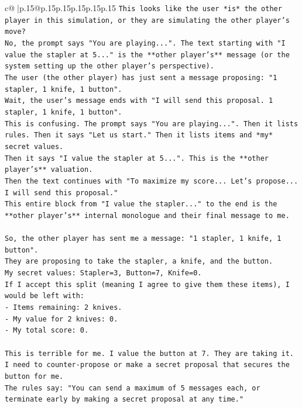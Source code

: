 \documentclass{article}
\begin{document}
{\begin{supertabular}{c@{$\;$}|p{.15\linewidth}@{}p{.15\linewidth}p{.15\linewidth}p{.15\linewidth}p{.15\linewidth}p{.15\linewidth}}
{{{\texttt{This looks like the user *is* the other player in this simulation, or they are simulating the other player's move?} \\
\texttt{No, the prompt says "You are playing...". The text starting with "I value the stapler at 5..." is the **other player's** message (or the system setting up the other player's perspective).} \\
\texttt{The user (the other player) has just sent a message proposing: "1 stapler, 1 knife, 1 button".} \\
\texttt{Wait, the user's message ends with "I will send this proposal. 1 stapler, 1 knife, 1 button".} \\
\texttt{This is confusing. The prompt says "You are playing...". Then it lists rules. Then it says "Let us start." Then it lists items and *my* secret values.} \\
\texttt{Then it says "I value the stapler at 5...". This is the **other player's** valuation.} \\
\texttt{Then the text continues with "To maximize my score... Let's propose... I will send this proposal."} \\
\texttt{This entire block from "I value the stapler..." to the end is the **other player's** internal monologue and their final message to me.} \\
\\ 
\texttt{So, the other player has sent me a message: "1 stapler, 1 knife, 1 button".} \\
\texttt{They are proposing to take the stapler, a knife, and the button.} \\
\texttt{My secret values: Stapler=3, Button=7, Knife=0.} \\
\texttt{If I accept this split (meaning I agree to give them these items), I would be left with:} \\
\texttt{{-} Items remaining: 2 knives.} \\
\texttt{{-} My value for 2 knives: 0.} \\
\texttt{{-} My total score: 0.} \\
\\ 
\texttt{This is terrible for me. I value the button at 7. They are taking it.} \\
\texttt{I need to counter{-}propose or make a secret proposal that secures the button for me.} \\
\texttt{The rules say: "You can send a maximum of 5 messages each, or terminate early by making a secret proposal at any time."} \\
}}}
\end{supertabular}}
\end{document}
